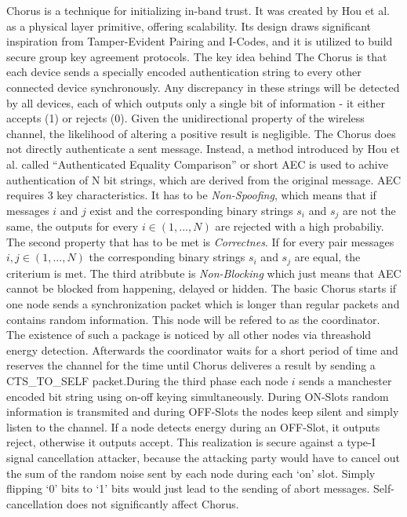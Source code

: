 \documentclass[conference]{IEEEtran}
\begin{document}
Chorus is a technique for initializing in-band trust. It was created by Hou et al. as a physical layer primitive, offering scalability.
Its design draws significant inspiration from Tamper-Evident Pairing and I-Codes, and it is utilized to build secure group key agreement protocols.
The key idea behind The Chorus is that each device sends a specially encoded authentication string to every other connected device synchronously. 
Any discrepancy in these strings will be detected by all devices, each of which outputs only a single bit of information - it either accepts (1) or rejects (0).
Given the unidirectional property of the wireless channel, the likelihood of altering a positive result is negligible. The Chorus does not directly authenticate a sent message. Instead, a method introduced by Hou et al. called ``Authenticated Equality Comparison'' or short AEC is used to achive authentication of N bit strings, which are derived from the original message. 
AEC requires 3 key characteristics. It has to be \textit{Non-Spoofing}, which means that if messages $i$ and $j$ exist and the corresponding binary strings $s_i$ and $s_j$ are not the same, the outputs for every $i \in (1, . . . , N)$ are rejected with a high probabiliy. The second property that has to be met is \textit{Correctnes}. If for every pair messages $i,j \in (1, . . . , N)$ the corresponding binary strings $s_i$ and $s_j$ are equal, the criterium is met. The third atribbute is \textit{Non-Blocking} which just means that AEC cannot be blocked from happening, delayed or hidden.
The basic Chorus starts if one node sends a synchronization packet which is longer than regular packets and contains random information. This node will be refered to as the coordinator. The existence of such a package is noticed by all other nodes via threashold energy detection. Afterwards the coordinator waits for a short period of time and reserves the channel for the time until Chorus deliveres a result by sending a CTS\_TO\_SELF packet.During the third phase each node $i$ sends a manchester encoded bit string using on-off keying simultaneously. During ON-Slots random information is transmited and during OFF-Slots the nodes keep silent and simply listen to the channel. If a node detects energy during an OFF-Slot, it outputs reject, otherwise it outputs accept.
This realization is secure against a type-I signal cancellation attacker, because the attacking party would have to cancel out the sum of the random noise sent by each node during each `on' slot. Simply flipping `0' bits to `1' bits would just lead to the sending of abort messages. Self-cancellation does not significantly affect Chorus. \\
\end{document}
